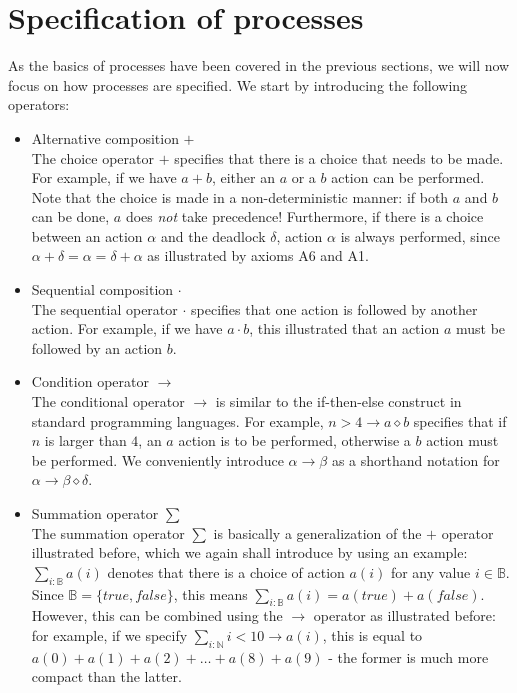 \section{Specification of processes}
\label{sec:specifyproc}

As the basics of processes have been covered in the previous sections, we will now focus on how processes are specified. We start by introducing the following operators:

\begin{itemize}
\item Alternative composition $+$ \\
The choice operator $+$  specifies that there is a choice that needs to be made. For example, if we have $a + b$, either an $a$ or a $b$ action can be performed. Note that the choice is made in a non-deterministic manner: if both $a$ and $b$ can be done, $a$ does \emph{not} take precedence! Furthermore, if there is a choice between an action $\alpha$ and the deadlock $\delta$, action $\alpha$ is always performed, since $\alpha + \delta = \alpha = \delta + \alpha$ as illustrated by axioms A6 and A1.
\item Sequential composition $\cdot$ \\
The sequential operator $\cdot$ specifies that one action is followed by another action. For example, if we have $a \cdot b$, this illustrated that an action $a$ must be followed by an action $b$.
\item Condition operator $\rightarrow$ \\
The conditional operator $\rightarrow$ is similar to the if-then-else construct in standard programming languages. For example, $n > 4 \rightarrow a \diamond b$ specifies that if $n$ is larger than $4$, an $a$ action is to be performed, otherwise a $b$ action must be performed. We conveniently introduce $\alpha \rightarrow \beta$ as a shorthand notation for $\alpha \rightarrow \beta \diamond \delta$.
\item Summation operator $\sum$ \\
The summation operator $\sum$ is basically a generalization of the $+$ operator illustrated before, which we again shall introduce by using an example: $\sum_{i: \mathds{B}} a(i)$ denotes that there is a choice of action $a(i)$ for any value $i \in \mathds{B}$. Since $\mathds{B} = \{ true, false \}$, this means $\sum_{i: \mathds{B}} a(i) = a(true) + a(false)$. However, this can be combined using the $\rightarrow$ operator as illustrated before: for example, if we specify $\sum_{i : \mathds{N}} i < 10 \rightarrow a(i)$, this is equal to $a(0) + a(1) + a(2) + \dots + a(8) + a(9)$ - the former is much more compact than the latter.
\end{itemize}

